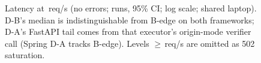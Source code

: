 \begin{figure}[t]
\centering
{}
\caption{Latency at \PerfRate{}\,req/s (no errors; \PerfRuns{} runs, 95\% CI;
log scale; shared laptop). D-B's median is indistinguishable from B-edge on
both frameworks; D-A's FastAPI tail comes from that executor's origin-mode
verifier call (Spring D-A tracks B-edge). Levels $\ge$\PerfSatRate{}\,req/s
are omitted as 502 saturation.}
\label{fig:latency}
\end{figure}
